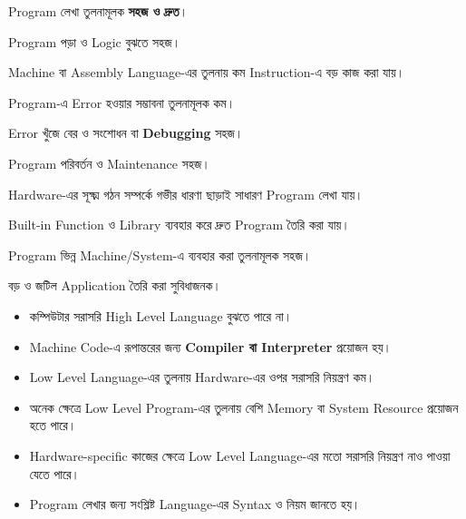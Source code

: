 
\begin{compacttwocolpoints}

\item Program লেখা তুলনামূলক \textbf{সহজ ও দ্রুত}।

\item Program পড়া ও Logic বুঝতে সহজ।

\item Machine বা Assembly Language-এর তুলনায় কম Instruction-এ
বড় কাজ করা যায়।

\item Program-এ Error হওয়ার সম্ভাবনা তুলনামূলক কম।

\item Error খুঁজে বের ও সংশোধন বা \textbf{Debugging} সহজ।

\item Program পরিবর্তন ও Maintenance সহজ।

\item Hardware-এর সূক্ষ্ম গঠন সম্পর্কে গভীর ধারণা ছাড়াই
সাধারণ Program লেখা যায়।

\item Built-in Function ও Library ব্যবহার করে দ্রুত Program তৈরি করা যায়।

\item Program ভিন্ন Machine/System-এ ব্যবহার করা তুলনামূলক সহজ।

\item বড় ও জটিল Application তৈরি করা সুবিধাজনক।

\end{compacttwocolpoints}


\begin{itemize}

\item কম্পিউটার সরাসরি High Level Language বুঝতে পারে না।

\item Machine Code-এ রূপান্তরের জন্য
\textbf{Compiler বা Interpreter} প্রয়োজন হয়।

\item Low Level Language-এর তুলনায় Hardware-এর ওপর সরাসরি
নিয়ন্ত্রণ কম।

\item অনেক ক্ষেত্রে Low Level Program-এর তুলনায় বেশি Memory বা
System Resource প্রয়োজন হতে পারে।

\item Hardware-specific কাজের ক্ষেত্রে Low Level Language-এর মতো
সরাসরি নিয়ন্ত্রণ নাও পাওয়া যেতে পারে।

\item Program লেখার জন্য সংশ্লিষ্ট Language-এর Syntax ও নিয়ম জানতে হয়।

\end{itemize}

